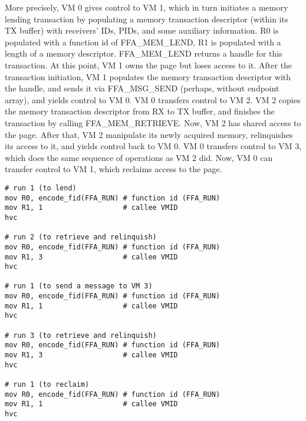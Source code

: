 \documentclass{article}
\begin{document}
More precisely, VM 0 gives control to VM 1, which in turn initiates a memory lending transaction by populating a memory transaction descriptor (within its TX buffer) with receivers' IDs, PIDs, and some auxiliary information. R0 is populated with a function id of FFA\_MEM\_LEND, R1 is populated with a length of a memory descriptor. FFA\_MEM\_LEND returns a handle for this transaction. At this point, VM 1 owns the page but loses access to it. After the transaction initiation, VM 1 populates the memory transaction descriptor with the handle, and sends it via FFA\_MSG\_SEND (perhaps, without endpoint array), and yields control to VM 0. VM 0 transfers control to VM 2. VM 2 copies the memory transaction descriptor from RX to TX buffer, and finishes the transaction by calling FFA\_MEM\_RETRIEVE. Now, VM 2 has shared access to the page. After that, VM 2 manipulate its newly acquired memory, relinquishes its access to it, and yields control back to VM 0. VM 0 transfers control to VM 3, which does the same sequence of operations as VM 2 did. Now, VM 0 can transfer control to VM 1, which reclaims access to the page.

\begin{lstlisting}[caption={VM 0}]
# run 1 (to lend)
mov R0, encode_fid(FFA_RUN) # function id (FFA_RUN)
mov R1, 1                   # callee VMID
hvc

# run 2 (to retrieve and relinquish)
mov R0, encode_fid(FFA_RUN) # function id (FFA_RUN)
mov R1, 3                   # callee VMID
hvc

# run 1 (to send a message to VM 3)
mov R0, encode_fid(FFA_RUN) # function id (FFA_RUN)
mov R1, 1                   # callee VMID
hvc

# run 3 (to retrieve and relinquish)
mov R0, encode_fid(FFA_RUN) # function id (FFA_RUN)
mov R1, 3                   # callee VMID
hvc

# run 1 (to reclaim)
mov R0, encode_fid(FFA_RUN) # function id (FFA_RUN)
mov R1, 1                   # callee VMID
hvc
\end{lstlisting}
\end{document}

